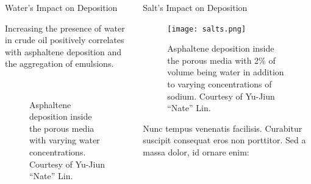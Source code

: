\documentclass[final]{beamer}
\newlength{\onecolwid}
\newlength{\twocolwid}
\begin{document}
\begin{frame}[t, fragile]
\begin{columns}[t]
\begin{column}{\twocolwid}
\begin{columns}[t,totalwidth=\twocolwid]
\begin{column}{\onecolwid}

\begin{block}{Water's Impact on Deposition}

Increasing the presence of water in crude oil positively correlates with asphaltene deposition and the aggregation of emulsions.

\vspace{1em}

\begin{figure}[!tbp]
  \centering
  \hfill
   \\
  
  \hfill
  \caption{Asphaltene deposition inside the porous media with varying water concentrations. Courtesy of Yu-Jiun ``Nate'' Lin.}
\end{figure}

\vspace{0.5em}

\end{block}


\end{column} %

\begin{column}{\onecolwid}\vspace{-.6in} %


\begin{block}{Salt's Impact on Deposition}

\begin{figure}
\texttt{[image: salts.png]}
\caption{Asphaltene deposition inside the porous media with 2\% of volume being water in addition to varying concentrations of sodium. Courtesy of Yu-Jiun ``Nate'' Lin.}
\end{figure}

Nunc tempus venenatis facilisis. Curabitur suscipit consequat eros non porttitor. Sed a massa dolor, id ornare enim:


\end{block}
\end{column}
\end{columns}
\end{column}
\end{columns}
\end{frame}
\end{document}

